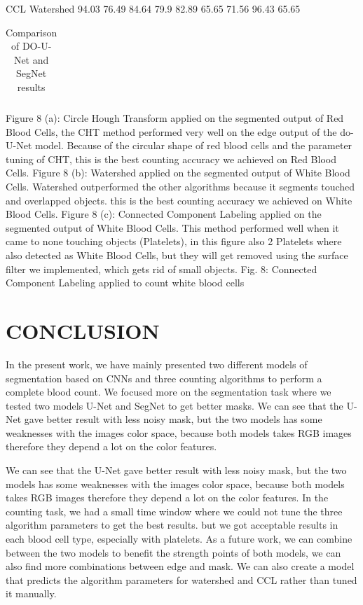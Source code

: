 \documentclass[conference]{IEEEtran}
\begin{document}
CCL Watershed
94.03
76.49
84.64
79.9
82.89
65.65
71.56
96.43
65.65
\begin{table}[htbp]
\centering
\caption{Comparison of DO-U-Net and SegNet results}
\label{tab:Comparison of DO-U-Net and SegNet results}
\begin{tabular}{lll}
\hline
& & \\
\hline
\end{tabular}
\end{table}
Figure 8 (a): Circle Hough Transform applied on the segmented output of Red Blood Cells, the CHT method performed very well on the edge output of the do-U-Net model. Because of the circular shape of red blood cells and the parameter tuning of CHT, this is the best counting accuracy we achieved on Red Blood Cells.
Figure 8 (b): Watershed applied on the segmented output of White Blood Cells. Watershed outperformed the other algorithms because it segments touched and overlapped objects. this is the best counting accuracy we achieved on White Blood Cells.
Figure 8 (c): Connected Component Labeling applied on the segmented output of White Blood Cells. This method performed well when it came to none touching objects (Platelets), in this figure also 2 Platelets where also detected as White Blood Cells, but they will get removed using the surface filter we implemented, which gets rid of small objects.
Fig. 8: Connected Component Labeling applied to count white blood cells
\section{CONCLUSION}
In the present work, we have mainly presented two different models of segmentation based on CNNs and three counting algorithms to perform a complete blood count. We focused more on the segmentation task where we tested two models U-Net and SegNet to get better masks.
We can see that the U-Net gave better result with less noisy mask, but the two models has some weaknesses with the images color space, because both models takes RGB images therefore they depend a lot on the color features.

We can see that the U-Net gave better result with less noisy mask, but the two models has some weaknesses with the images color space, because both models takes RGB images therefore they depend a lot on the color features.
In the counting task, we had a small time window where we could not tune the three algorithm parameters to get the best results. but we got acceptable results in each blood cell type, especially with platelets.
As a future work, we can combine between the two models to benefit the strength points of both models, we can also find more combinations between edge and mask. We can also create a model that predicts the algorithm parameters for watershed and CCL rather than tuned it manually.
\end{document}

